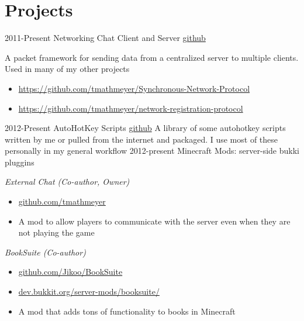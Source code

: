 \documentclass[]{friggeri-cv} %
\begin{document}
\section{Projects}
\begin{entrylist}
\entry
{2011-Present}
{Networking Chat Client and Server}
{\href{https://github.com/tmathmeyer/Synchronous-Network-Protocol}{github}}
{A packet framework for sending data from a centralized server to multiple clients. Used in many of my other projects
\begin{itemize}
	\item\href{https://github.com/tmathmeyer/Synchronous-Network-Protocol}{https://github.com/tmathmeyer/Synchronous-Network-Protocol}
	\item\href{https://github.com/tmathmeyer/network-registration-protocol}{https://github.com/tmathmeyer/network-registration-protocol}
\end{itemize}
}
\entry
{2012-Present}
{AutoHotKey Scripts}
{\href{https://github.com/tmathmeyer/AHK-projects}{github}}
{A library of some autohotkey scripts written by me or pulled from the internet and packaged. I use most of these personally in my general workflow}
\entry
{2012-present}
{Minecraft Mods:}
{server-side bukki pluggins}
{\emph{External Chat (Co-author, Owner)}
	\begin{itemize}
		\item\href{https://github.com/tmathmeyer/external_chat--bukkit-mod-}{github.com/tmathmeyer}
		\item A mod to allow players to communicate with the server even when they are not playing the game
	\end{itemize} 
\emph{BookSuite (Co-author)}
	\begin{itemize}
		\item\href{https://github.com/Jikoo/BookSuite}{github.com/Jikoo/BookSuite}
		\item\href{http://dev.bukkit.org/server-mods/booksuite/}{dev.bukkit.org/server-mods/booksuite/}
		\item A mod that adds tons of functionality to books in Minecraft
	\end{itemize}
}
\end{entrylist}

\end{document}
